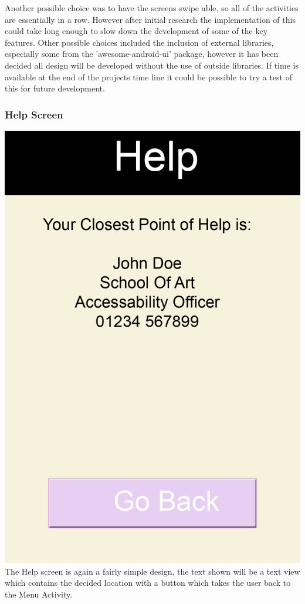 \documentclass[10pt,a4paper]{article}
\begin{document}
Another possible choice was to have the screens swipe able, so all of the activities are essentially in a row. However after initial research the implementation of this could take long enough to slow down the development of some of the key features. Other possible choices included the inclusion of external libraries, especially some from the 'awesome-android-ui' package, however it has been decided all design will be developed without the use of outside libraries. If time is available at the end of the projects time line it could be possible to try a test of this for future development. 
\subsubsection{Help Screen}
\includegraphics[scale=0.6]{Help.png} \\
The Help screen is again a fairly simple design, the text shown will be a text view which contains the decided location with a button which takes the user back to the Menu Activity. 
\end{document}
